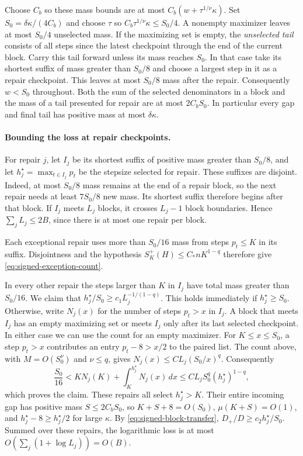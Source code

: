 \documentclass[11pt]{article}
\theoremstyle{definition}
\begin{document}
Choose \(C_b\) so these mass bounds are at most
\(C_b(w+\tau^{1/\nu}\kappa)\). Set \(S_0=\delta\kappa/(4C_b)\)
and choose \(\tau\) so \(C_b\tau^{1/\nu}\kappa\le S_0/4\).
A nonempty maximizer leaves at most \(S_0/4\) unselected mass.
If the maximizing set is empty, the \emph{unselected tail} consists of all
steps since the latest checkpoint through the end of the current block.
Carry this tail forward unless its mass reaches \(S_0\). In that case take its shortest suffix of mass
greater than \(S_0/8\) and choose a largest step in it as a repair
checkpoint. This leaves at most \(S_0/8\) mass after the repair.
Consequently \(w<S_0\) throughout. Both the sum of the selected
denominators in a block and the mass of a tail presented for repair
are at most \(2C_b S_0\). In particular every gap and final tail has
positive mass at most \(\delta\kappa\).

\paragraph{Bounding the loss at repair checkpoints.}
For repair \(j\), let \(I_j\) be its shortest suffix of positive mass
greater than \(S_0/8\), and let \(h_j^\star=\max_{t\in I_j}p_t\)
be the stepsize selected for repair. These suffixes are disjoint.
Indeed, at most \(S_0/8\) mass remains at the end of a repair block,
so the next repair needs at least \(7S_0/8\) new mass. Its shortest
suffix therefore begins after that block. If \(I_j\) meets \(L_j\)
blocks, it crosses \(L_j-1\) block boundaries. Hence
\(\sum_j L_j\le 2B\), since there is at most one repair per block.

Each exceptional repair uses more than \(S_0/16\) mass from steps \(p_t\le K\) in its suffix. Disjointness and the hypothesis \(S_K^+(H)\le C_*nK^{1-q}\) therefore give \eqref{eq:signed-exception-count}.

In every other repair the steps larger than \(K\) in \(I_j\)
have total mass greater than \(S_0/16\). We claim that
\(h_j^\star/S_0\ge c_1 L_j^{-1/(1-q)}\). This holds immediately
if \(h_j^\star\ge S_0\). Otherwise, write \(N_j(x)\) for the
number of steps \(p_t>x\) in \(I_j\). A block that meets \(I_j\) has
an empty maximizing set or meets \(I_j\) only after its last selected
checkpoint. In either case we can use the count for an empty maximizer.
For \(K\le x\le S_0\), a step \(p_t>x\) contributes an entry
\(p_t-8>x/2\) to the paired list. The count above, with
\(M=O(S_0^\nu)\) and \(\nu\le q\), gives
\(N_j(x)\le C L_j(S_0/x)^q\). Consequently
\[
 \frac{S_0}{16}
 < K N_j(K)+\int_K^{h_j^\star} N_j(x)\,dx
 \le C L_j S_0^q(h_j^\star)^{1-q},
\]
which proves the claim. These repairs all select \(h_j^\star>K\).
Their entire incoming gap has positive mass \(S\le 2C_bS_0\), so
\(K+S+8=O(S_0)\), \(\mu(K+S)=O(1)\), and \(h_j^\star-8\ge
h_j^\star/2\) for large \(\kappa\). By \eqref{eq:signed-block-transfer},
\(D_+/D\ge c_2 h_j^\star/S_0\). Summed over these repairs, the
logarithmic loss is at most \(O(\sum_j(1+\log L_j))=O(B)\).
\end{document}
